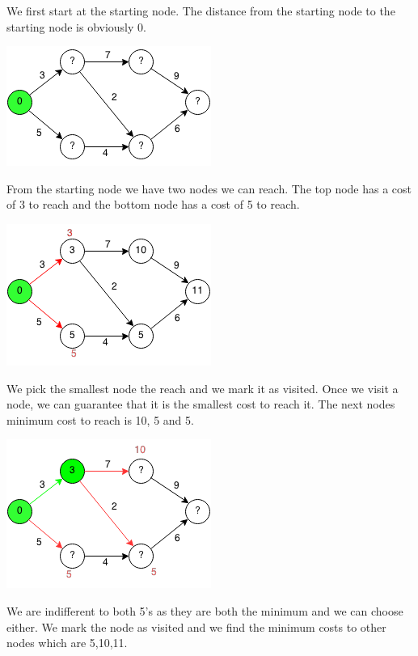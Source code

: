 \documentclass[11pt,oneside]{book}
\makeatletter
\def\maxwidth#1{\ifdim\Gin@nat@width>#1 #1\else\Gin@nat@width\fi}
\makeatother
\begin{document}
We first start at the starting node. The distance from the starting node to the starting node is obviously 0.

\vspace{5px}\includegraphics[width=\maxwidth{\textwidth}]{djikstra.png}

From the starting node we have two nodes we can reach. The top node has a cost of 3 to reach and the bottom node has a cost of 5 to reach.

\vspace{5px}\includegraphics[width=\maxwidth{\textwidth}]{djikstra1.png}

We pick the smallest node the reach and we mark it as visited. Once we visit a node, we can guarantee that it is the smallest cost to reach it. The next nodes minimum cost to reach is 10, 5 and 5.

\vspace{5px}\includegraphics[width=\maxwidth{\textwidth}]{djikstra2.png}

We are indifferent to both 5's as they are both the minimum and we can choose either. We mark the node as visited and we find the minimum costs to other nodes which are 5,10,11.
\end{document}
